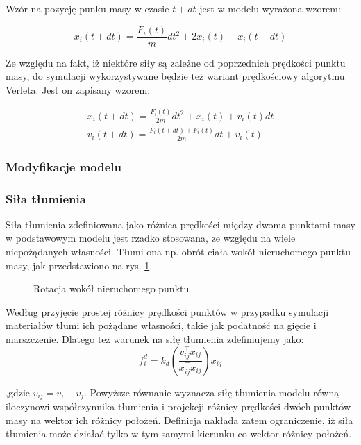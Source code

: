 Wzór na pozycję punku masy w czasie $t + dt$ jest w modelu wyrażona wzorem:

\begin{equation}
x_i(t + dt) = \frac{F_i(t)}{m} dt^2 + 2x_i(t) - x_i(t - dt)
\end{equation}

Ze względu na fakt, iż niektóre siły są zależne od poprzednich prędkości punktu masy, do symulacji wykorzystywane będzie też wariant prędkościowy algorytmu Verleta. Jest on zapisany wzorem:

\begin{eqnarray}
x_i(t + dt) = \frac{F_i(t)}{2m} dt^2 + x_i(t) + v_i(t)dt \\
v_i(t + dt) = \frac{F_i(t + dt) + F_i(t)}{2m}dt + v_i(t)
\end{eqnarray}

%
%
\subsubsection{Modyfikacje modelu}

\subsubsection{Siła tłumienia}
Siła tłumienia zdefiniowana jako różnica prędkości między dwoma punktami masy w podstawowym modelu jest rzadko stosowana, ze względu na wiele niepożądanych własności. Tłumi ona np. obrót ciała wokół nieruchomego punktu masy, jak przedstawiono na rys. \ref{tlumienie}.

\begin{figure}[ht]
\centering

\caption{Rotacja wokół nieruchomego punktu}
\label{tlumienie}
\end{figure}

Według \cite{pbdo} przyjęcie prostej różnicy prędkości punktów w przypadku symulacji materiałów tłumi ich pożądane własności, takie jak podatność na gięcie i marszczenie. Dlatego też warunek na siłę tłumienia zdefiniujemy jako:
\begin{equation}
f^{d}_i = k_d (\frac{v_{ij}^\intercal x_{ij}}{x_{ij}^\intercal x_{ij}}) x_{ij}
\end{equation}

,gdzie $v_{ij} = v_i - v_j$. Powyższe równanie wyznacza siłę tłumienia modelu równą iloczynowi współczynnika tłumienia i projekcji różnicy prędkości dwóch punktów masy na wektor ich różnicy położeń. Definicja nakłada zatem ograniczenie, iż siła tłumienia może działać tylko w tym samymi kierunku co wektor różnicy położeń.

